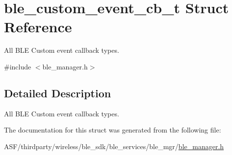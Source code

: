 \hypertarget{structble__custom__event__cb__t}{}\section{ble\+\_\+custom\+\_\+event\+\_\+cb\+\_\+t Struct Reference}
\label{structble__custom__event__cb__t}


All B\+LE Custom event callback types.  




{\ttfamily \#include $<$ble\+\_\+manager.\+h$>$}



\subsection{Detailed Description}
All B\+LE Custom event callback types. 

The documentation for this struct was generated from the following file\+:\begin{DoxyCompactItemize}
\item 
A\+S\+F/thirdparty/wireless/ble\+\_\+sdk/ble\+\_\+services/ble\+\_\+mgr/\mbox{\hyperlink{ble__manager_8h}{ble\+\_\+manager.\+h}}\end{DoxyCompactItemize}
